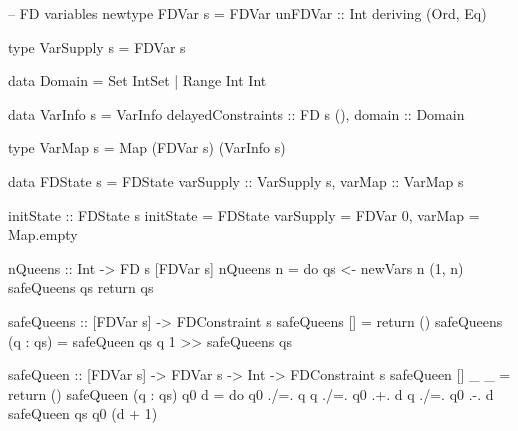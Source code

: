 \documentclass[aspectratio=169,hyphens]{beamer} %
\begin{document}
\begin{frame}[fragile]
\begin{code}
-- FD variables
newtype FDVar s = FDVar { unFDVar :: Int } deriving (Ord, Eq)

type VarSupply s = FDVar s

data Domain
    = Set IntSet
    | Range Int Int

data VarInfo s = VarInfo
     { delayedConstraints :: FD s (), domain :: Domain }

type VarMap s = Map (FDVar s) (VarInfo s)

data FDState s = FDState
     { varSupply :: VarSupply s, varMap :: VarMap s }

initState :: FDState s
initState = FDState { varSupply = FDVar 0, varMap = Map.empty }
\end{code}
\end{frame}

\begin{frame}[fragile]
\begin{code}
nQueens :: Int -> FD s [FDVar s]
nQueens n = do
    qs <- newVars n (1, n)
    safeQueens qs
    return qs

safeQueens :: [FDVar s] -> FDConstraint s
safeQueens [] = return ()
safeQueens (q : qs) = safeQueen qs q 1 >> safeQueens qs

safeQueen :: [FDVar s] -> FDVar s -> Int -> FDConstraint s
safeQueen [] _ _ = return ()
safeQueen (q : qs) q0 d = do
   q0 ./=. q 
   q ./=. q0 .+. d
   q ./=. q0 .-. d
   safeQueen qs q0 (d + 1)
\end{code}
\end{frame}
\end{document}
